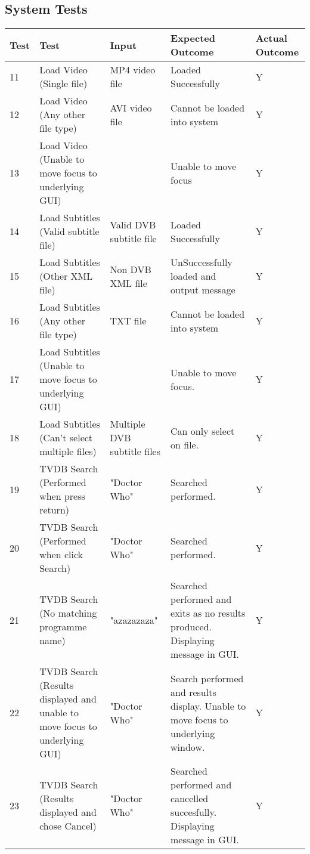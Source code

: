 \subsection{System Tests}
\label{sec:SystemTestAppendix}

\begin{center}
\begin{longtable}{| p{18pt} | p{100pt}| p{100pt}| p{110pt} | p{46pt} |}
\hline
Test &Test														&Input				&Expected Outcome					&Actual Outcome
\\\hline
11 	&Load Video (Single file)										&MP4 video file			&Loaded Successfully						&Y	
\\\hline
12	&Load Video (Any other file type)									&AVI video file			&Cannot be loaded into system				&Y			
\\\hline
13	&Load Video (Unable to move focus to underlying GUI)					&					&Unable to move focus					&Y				
\\\hline					
14	&Load Subtitles (Valid subtitle file)								&Valid DVB subtitle file	&Loaded Successfully						&Y			
\\\hline
15	&Load Subtitles (Other XML file)									&Non DVB XML file		&UnSuccessfully loaded and output message		&Y			
\\\hline	
16	&Load Subtitles (Any other file type)								&TXT file				&Cannot be loaded into system				&Y				
\\\hline
17	&Load Subtitles (Unable to move focus to underlying GUI)				&					&Unable to move focus.					&Y			
\\\hline
18	&Load Subtitles (Can't select multiple files)							&Multiple DVB subtitle files	&Can only select on file.					&Y			
\\\hline	
19	&TVDB Search (Performed when press return)							&"Doctor Who"			&Searched performed.						&Y		
\\\hline	
20	&TVDB Search (Performed when click Search)							&"Doctor Who"			&Searched performed.						&Y	
\\\hline	
21	&TVDB Search (No matching programme name)						&"azazazaza"			&Searched performed and exits as no results produced. Displaying message in GUI.	&Y	
\\\hline	
22	&TVDB Search (Results displayed and unable to move focus to underlying GUI)	&"Doctor Who"			&Search performed and results display. Unable to move focus to underlying window.	&Y
\\\hline	
23	&TVDB Search (Results displayed and chose Cancel)					&"Doctor Who"			&Searched performed and cancelled succesfully. Displaying message in GUI.	&Y 

\end{longtable}
\end{center}
